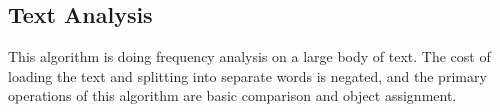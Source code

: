 \subsection{Text Analysis}
This algorithm is doing frequency analysis on a large body of text.  The cost of loading the text and splitting into separate words is negated, and the primary operations of this algorithm are basic comparison and object assignment.
